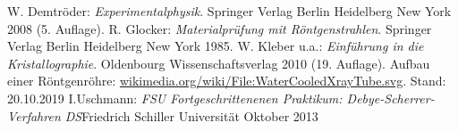 \documentclass[a4paper,twoside,final]{article}
\begin{document}

\begin{thebibliography}{xxx}
	W. Demtröder: \textit{Experimentalphysik}. Springer Verlag Berlin Heidelberg New York 2008 (5. Auflage).
	R. Glocker: \textit{Materialprüfung mit Röntgenstrahlen}. Springer Verlag Berlin Heidelberg New York 1985.
	W. Kleber u.a.: \textit{Einführung in die Kristallographie}. Oldenbourg Wissenschaftsverlag 2010 (19. Auflage).
  Aufbau einer Röntgenröhre: \url{wikimedia.org/wiki/File:WaterCooledXrayTube.svg}. Stand: 20.10.2019
  I.Uschmann: \textit{FSU Fortgeschrittenenen Praktikum: Debye-Scherrer-Verfahren DS}Friedrich Schiller Universität Oktober 2013
\end{thebibliography}
\end{document}
